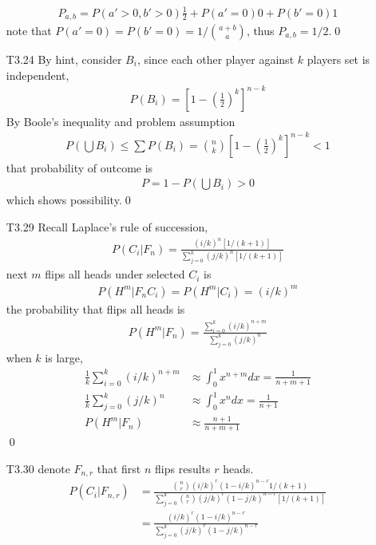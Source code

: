 \documentclass[paper=a4, fontsize=11pt]{scrartcl} %
\numberwithin{equation}{section} %
\numberwithin{figure}{section} %
\numberwithin{table}{section} %
\begin{document}
\begin{itemize}
	\begin{align}
		P_{a,b} = P(a'>0,b'>0)\frac{1}{2} + P(a'=0)0 + P(b'=0)1
	\end{align}
	note that $P(a'=0)=P(b'=0) = 1/{a+b \choose a}$, thus $P_{a,b} = 1/2$.\qed
	\item[T3.24] By hint, consider $B_i$, since each other player against $k$ players set is independent,
	\begin{align}
		P(B_i) = \left[ 1 - \left(\frac{1}{2}\right)^k \right]^{n-k}
	\end{align}
	By Boole's inequality and problem assumption
	\begin{align}
		P(\bigcup B_i) \leq \sum P(B_i) = {n\choose k} \left[ 1 - \left(\frac{1}{2}\right)^k \right]^{n-k}<1
	\end{align}
	that probability of outcome is
	\begin{align}
		P = 1 - P(\bigcup B_i) >0
	\end{align}
	which shows possibility.\qed
	\item[T3.29] Recall Laplace's rule of succession,
	\begin{align}
		P(C_i|F_n) = \frac{(i/k)^n[1/(k+1)]}{\sum_{j=0}^k(j/k)^n[1/(k+1)]}
	\end{align}
	next $m$ flips all heads under selected $C_i$ is 
	\begin{align}
		P(H^m|F_nC_i) = P(H^m|C_i) = (i/k)^m
	\end{align}
	the probability that flips all heads is
	\begin{align}
		P(H^m|F_n) = \frac{\sum_{i=0}^k (i/k)^{n+m}}{\sum_{j=0}^k(j/k)^n}
	\end{align}
	when $k$ is large,
	\begin{align}
		\frac{1}{k}\sum_{i=0}^k (i/k)^{n+m} &\approx  \int_0^1 x^{n+m}dx = \frac{1}{n+m+1}\\
		\frac{1}{k}\sum_{j=0}^k (j/k)^{n} &\approx  \int_0^1 x^{n}dx = \frac{1}{n+1}\\
		P(H^m|F_n) &\approx \frac{n+1}{n+m+1}
	\end{align}\qed
	\item[T3.30] denote $F_{n,r}$ that first $n$ flips results $r$ heads.
	\begin{align}
		P(C_i|F_{n,r}) &= \frac{{n\choose r}(i/k)^r(1-i/k)^{n-r} 1/(k+1)}{\sum_{j=0}^k{n\choose r}(j/k)^r(1-j/k)^{n-r}[1/(k+1)]} \\
			&= \frac{(i/k)^r(1-i/k)^{n-r} }{\sum_{j=0}^k(j/k)^r(1-j/k)^{n-r}}
	\end{align}
	\begin{align}

\end{align}
\end{itemize}
\end{document}
